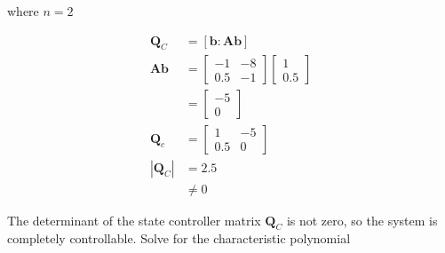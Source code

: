 \documentclass[main.tex]{subfiles}
\begin{document}
\begin{enumerate}
\begin{enumerate}
        where $n=2$

        $$
        \begin{aligned}
        \textbf{Q}_C &= [\textbf{b} : \textbf{A}\textbf{b}] \\
        \textbf{A} \textbf{b} &= \left[\begin{array}{cc}
        -1 & -8 \\
        0.5 & -1
        \end{array}\right]\left[\begin{array}{l}
        1 \\
        0.5
        \end{array}\right] \\
        & =\left[\begin{array}{c}
        -5 \\
        0
        \end{array}\right] \\
        \textbf{Q}_c &= \left[\begin{array}{cc}
        1 & -5 \\
        0.5 & 0
        \end{array}\right] \\
        |\textbf{Q}_C| &= 2.5\\
        & \neq 0
        \end{aligned}
        $$

        The determinant of the state controller matrix $\textbf{Q}_C$ is not zero, so the system is completely controllable. Solve for the characteristic polynomial 


\end{enumerate}
\end{enumerate}
\end{document}
